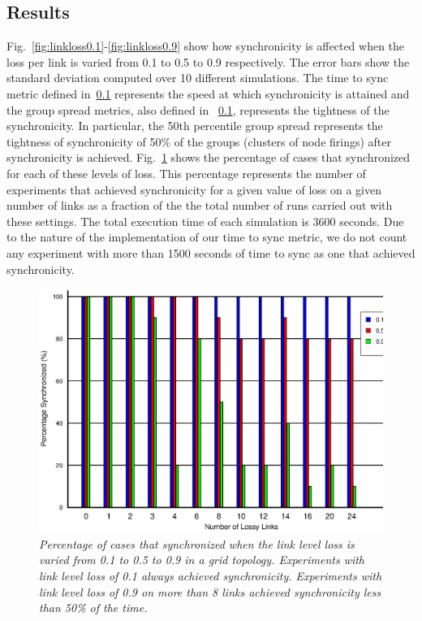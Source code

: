 \subsection{Results}

\noindent
Fig.~\ref{fig:linkloss0.1}-\ref{fig:linkloss0.9} show how synchronicity is affected when the 
loss per link is varied from 0.1 to 0.5 to 0.9 respectively. 
The error bars show the standard deviation computed over 10 different simulations.
The time to sync metric defined in~\ref{} represents the speed at which synchronicity is 
attained and the group spread metrics, also defined in ~\ref{},
represents the tightness of the synchronicity.  In particular, the 50th percentile group spread 
represents the tightness of synchronicity of 50\% of the groups (clusters of node firings) 
after synchronicity is achieved.
Fig.~\ref{fig:percent-synch-loss} shows the percentage of cases that synchronized for
each of these levels of loss. This percentage represents the number of 
experiments that achieved synchronicity for a given value of loss on a given number of links
as a fraction of the the total number of runs carried out with these settings. The total execution 
time of each simulation is 3600 seconds.  Due to the nature of the implementation of our time to sync
metric, we do not count any experiment with more than 1500 seconds of time to sync as one that
achieved synchronicity.  
\newline


\begin{figure}
\centerline{%
\includegraphics[width=14cm]{figures/percent-synch-linkloss.eps}
}
\caption{ {\it Percentage of cases that synchronized when the link level loss is varied from 0.1 to 0.5 to 0.9 in a grid topology.  Experiments with link level loss of 0.1 always achieved synchronicity.  Experiments with link level loss of 0.9 on more than 8 links achieved synchronicity less than 50\% of the time.}}
\label{fig:percent-synch-loss}
\end{figure}


